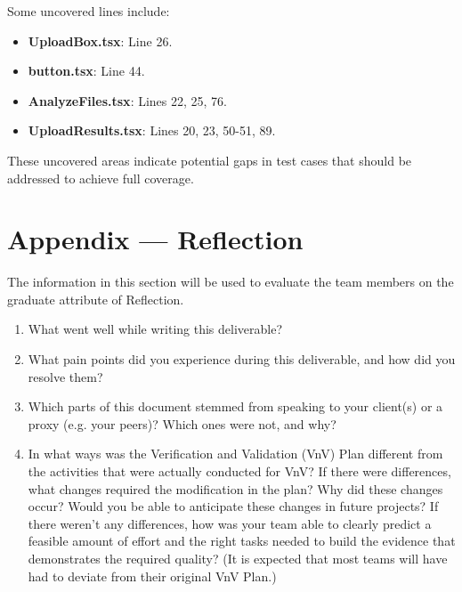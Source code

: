 \documentclass[12pt, titlepage]{article}
\begin{document}
Some uncovered lines include:

\begin{itemize}
\item \textbf{UploadBox.tsx}: Line 26.
\item \textbf{button.tsx}: Line 44.
\item \textbf{AnalyzeFiles.tsx}: Lines 22, 25, 76.
\item \textbf{UploadResults.tsx}: Lines 20, 23, 50-51, 89.
\end{itemize}

These uncovered areas indicate potential gaps in test cases that should be addressed to achieve full coverage.




\newpage{}
\section*{Appendix --- Reflection}

The information in this section will be used to evaluate the team members on the
graduate attribute of Reflection.



\begin{enumerate}
  \item What went well while writing this deliverable? 
  \item What pain points did you experience during this deliverable, and how
    did you resolve them?
  \item Which parts of this document stemmed from speaking to your client(s) or
  a proxy (e.g. your peers)? Which ones were not, and why?
  \item In what ways was the Verification and Validation (VnV) Plan different
  from the activities that were actually conducted for VnV?  If there were
  differences, what changes required the modification in the plan?  Why did
  these changes occur?  Would you be able to anticipate these changes in future
  projects?  If there weren't any differences, how was your team able to clearly
  predict a feasible amount of effort and the right tasks needed to build the
  evidence that demonstrates the required quality?  (It is expected that most
  teams will have had to deviate from their original VnV Plan.)
\end{enumerate}
\end{document}

